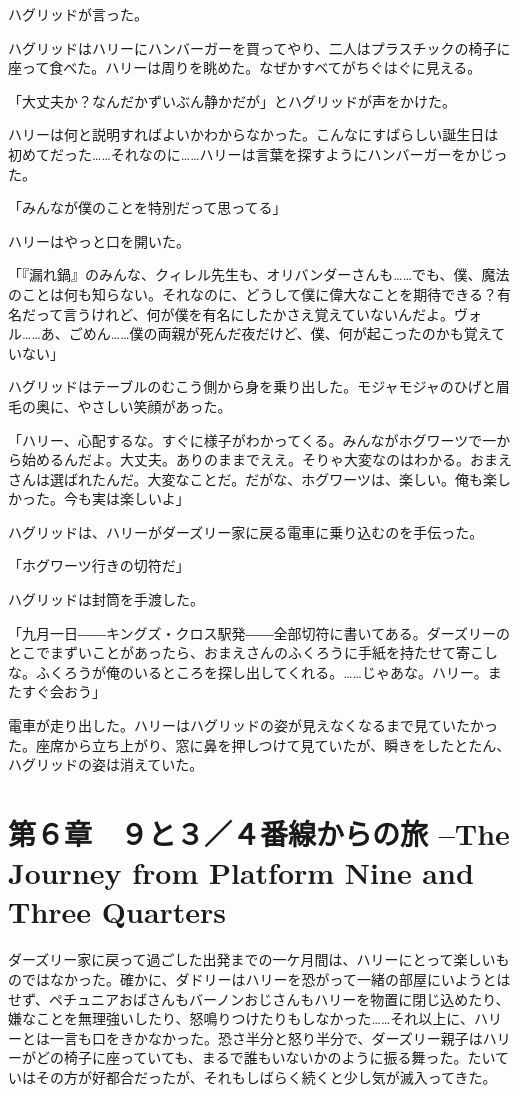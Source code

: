 \documentclass[10pt,a4paper]{article}
\begin{document}
\begin{CJK}{UTF8}{min}
ハグリッドが言った。

ハグリッドはハリーにハンバーガーを買ってやり、二人はプラスチックの椅子に座って食べた。ハリーは周りを眺めた。なぜかすべてがちぐはぐに見える。

「大丈夫か？なんだかずいぶん静かだが」とハグリッドが声をかけた。

ハリーは何と説明すればよいかわからなかった。こんなにすばらしい誕生日は初めてだった……それなのに……ハリーは言葉を探すようにハンバーガーをかじった。

「みんなが僕のことを特別だって思ってる」

ハリーはやっと口を開いた。

「『漏れ鍋』のみんな、クィレル先生も、オリバンダーさんも……でも、僕、魔法のことは何も知らない。それなのに、どうして僕に偉大なことを期待できる？有名だって言うけれど、何が僕を有名にしたかさえ覚えていないんだよ。ヴォル……あ、ごめん……僕の両親が死んだ夜だけど、僕、何が起こったのかも覚えていない」

ハグリッドはテーブルのむこう側から身を乗り出した。モジャモジャのひげと眉毛の奥に、やさしい笑顔があった。

「ハリー、心配するな。すぐに様子がわかってくる。みんながホグワーツで一から始めるんだよ。大丈夫。ありのままでええ。そりゃ大変なのはわかる。おまえさんは選ばれたんだ。大変なことだ。だがな、ホグワーツは、楽しい。俺も楽しかった。今も実は楽しいよ」

ハグリッドは、ハリーがダーズリー家に戻る電車に乗り込むのを手伝った。

「ホグワーツ行きの切符だ」

ハグリッドは封筒を手渡した。

「九月一日――キングズ・クロス駅発――全部切符に書いてある。ダーズリーのとこでまずいことがあったら、おまえさんのふくろうに手紙を持たせて寄こしな。ふくろうが俺のいるところを探し出してくれる。……じゃあな。ハリー。またすぐ会おう」

電車が走り出した。ハリーはハグリッドの姿が見えなくなるまで見ていたかった。座席から立ち上がり、窓に鼻を押しつけて見ていたが、瞬きをしたとたん、ハグリッドの姿は消えていた。




\section{第６章　９と３／４番線からの旅 --The Journey from Platform Nine and Three Quarters}





ダーズリー家に戻って過ごした出発までの一ケ月間は、ハリーにとって楽しいものではなかった。確かに、ダドリーはハリーを恐がって一緒の部屋にいようとはせず、ペチュニアおばさんもバーノンおじさんもハリーを物置に閉じ込めたり、嫌なことを無理強いしたり、怒鳴りつけたりもしなかった……それ以上に、ハリーとは一言も口をきかなかった。恐さ半分と怒り半分で、ダーズリー親子はハリーがどの椅子に座っていても、まるで誰もいないかのように振る舞った。たいていはその方が好都合だったが、それもしばらく続くと少し気が滅入ってきた。


\end{CJK}
\end{document}
